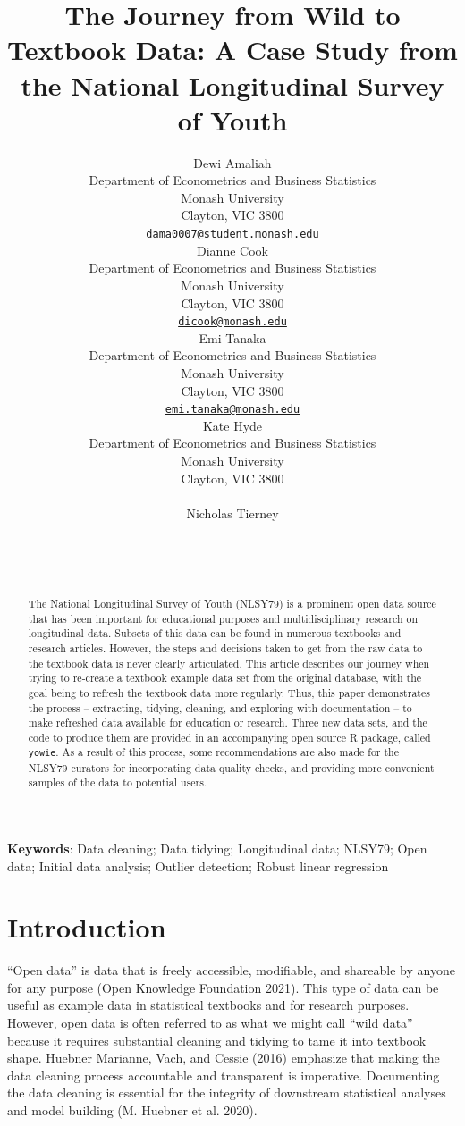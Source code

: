 \documentclass{article}
\title{The Journey from Wild to Textbook Data: A Case Study from the National Longitudinal Survey of Youth}
\author{
    Dewi Amaliah
   \\
    Department of Econometrics and Business Statistics \\
    Monash University \\
  Clayton, VIC 3800 \\
  \texttt{\href{mailto:dama0007@student.monash.edu}{\nolinkurl{dama0007@student.monash.edu}}} \\
   \And
    Dianne Cook
   \\
    Department of Econometrics and Business Statistics \\
    Monash University \\
  Clayton, VIC 3800 \\
  \texttt{\href{mailto:dicook@monash.edu}{\nolinkurl{dicook@monash.edu}}} \\
   \And
    Emi Tanaka
   \\
    Department of Econometrics and Business Statistics \\
    Monash University \\
  Clayton, VIC 3800 \\
  \texttt{\href{mailto:emi.tanaka@monash.edu}{\nolinkurl{emi.tanaka@monash.edu}}} \\
   \And
    Kate Hyde
   \\
    Department of Econometrics and Business Statistics \\
    Monash University \\
  Clayton, VIC 3800 \\
  \texttt{} \\
   \And
    Nicholas Tierney
   \\
     \\
   \\
  \texttt{} \\
  }
\begin{document}
\maketitle

\def\tightlist{}


\begin{abstract}
The National Longitudinal Survey of Youth (NLSY79) is a prominent open data source that has been important for educational purposes and multidisciplinary research on longitudinal data. Subsets of this data can be found in numerous textbooks and research articles. However, the steps and decisions taken to get from the raw data to the textbook data is never clearly articulated. This article describes our journey when trying to re-create a textbook example data set from the original database, with the goal being to refresh the textbook data more regularly. Thus, this paper demonstrates the process -- extracting, tidying, cleaning, and exploring with documentation -- to make refreshed data available for education or research. Three new data sets, and the code to produce them are provided in an accompanying open source R package, called \texttt{yowie}. As a result of this process, some recommendations are also made for the NLSY79 curators for incorporating data quality checks, and providing more convenient samples of the data to potential users.
\end{abstract}


\textbf{Keywords}: Data cleaning; Data tidying; Longitudinal data; NLSY79; Open data; Initial data analysis; Outlier detection; Robust linear regression

\hypertarget{intro}{%
\section{Introduction}\label{intro}}

``Open data'' is data that is freely accessible, modifiable, and shareable by anyone for any purpose (Open Knowledge Foundation 2021). This type of data can be useful as example data in statistical textbooks and for research purposes. However, open data is often referred to as what we might call ``wild data'' because it requires substantial cleaning and tidying to tame it into textbook shape. Huebner Marianne, Vach, and Cessie (2016) emphasize that making the data cleaning process accountable and transparent is imperative. Documenting the data cleaning is essential for the integrity of downstream statistical analyses and model building (M. Huebner et al. 2020).
\end{document}
